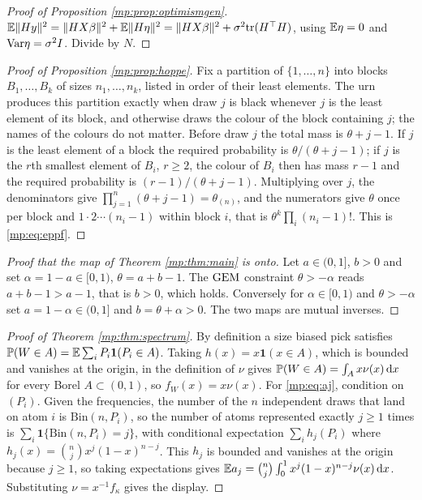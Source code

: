 \begin{proof}[Proof of Proposition \ref{mp:prop:optimismgen}]
$\mathbb{E}\|Hy\|^2=\|HX\beta\|^2+\mathbb{E}\|H\eta\|^2=\|HX\beta\|^2+\sigma^2\mathrm{tr}(H^\top H)$, using
$\mathbb{E}\eta=0$ and $\mathrm{Var}\eta=\sigma^2I$. Divide by $N$.
\end{proof}

\begin{proof}[Proof of Proposition \ref{mp:prop:hoppe}]
Fix a partition of $\{1,\dots,n\}$ into blocks $B_1,\dots,B_k$ of sizes $n_1,\dots,n_k$, listed
in order of their least elements. The urn produces this partition exactly when draw $j$ is
black whenever $j$ is the least element of its block, and otherwise draws the colour of the
block containing $j$; the names of the colours do not matter. Before draw $j$ the total mass
is $\theta+j-1$. If $j$ is the least element of a block the required probability is
$\theta/(\theta+j-1)$; if $j$ is the $r$th smallest element of $B_i$, $r\ge2$, the colour of
$B_i$ then has mass $r-1$ and the required probability is $(r-1)/(\theta+j-1)$. Multiplying
over $j$, the denominators give $\prod_{j=1}^n(\theta+j-1)=\theta_{(n)}$, and the numerators
give $\theta$ once per block and $1\cdot2\cdots(n_i-1)$ within block $i$, that is
$\theta^k\prod_i(n_i-1)!$. This is \eqref{mp:eq:eppf}.
\end{proof}

\begin{proof}[Proof that the map of Theorem \ref{mp:thm:main} is onto]
Let $a\in(0,1]$, $b>0$ and set $\alpha=1-a\in[0,1)$, $\theta=a+b-1$. The $\mathrm{GEM}$ constraint
$\theta>-\alpha$ reads $a+b-1>a-1$, that is $b>0$, which holds. Conversely for
$\alpha\in[0,1)$ and $\theta>-\alpha$ set $a=1-\alpha\in(0,1]$ and $b=\theta+\alpha>0$. The
two maps are mutual inverses.
\end{proof}

\begin{proof}[Proof of Theorem \ref{mp:thm:spectrum}]
By definition a size biased pick satisfies
$\mathbb{P}(W\in A)=\mathbb{E}\sum_iP_i\mathbf 1(P_i\in A)$. Taking $h(x)=x\mathbf 1(x\in A)$, which is
bounded and vanishes at the origin, in the definition of $\nu$ gives
$\mathbb{P}(W\in A)=\int_Ax\nu(x)\,\mathrm{d} x$ for every Borel $A\subset(0,1)$, so $f_W(x)=x\nu(x)$.
For \eqref{mp:eq:aj}, condition on $(P_i)$. Given the frequencies, the number of the $n$
independent draws that land on atom $i$ is $\mathrm{Bin}(n,P_i)$, so the number of atoms
represented exactly $j\ge1$ times is $\sum_i\mathbf 1\{\mathrm{Bin}(n,P_i)=j\}$, with
conditional expectation $\sum_i h_j(P_i)$ where $h_j(x)=\binom{n}{j}x^j(1-x)^{n-j}$. This $h_j$
is bounded and vanishes at the origin because $j\ge1$, so taking expectations gives
$\mathbb{E} a_j=\binom{n}{j}\int_0^1x^j(1-x)^{n-j}\nu(x)\,\mathrm{d} x$. Substituting $\nu=x^{-1}f_\kappa$
gives the display.
\end{proof}

